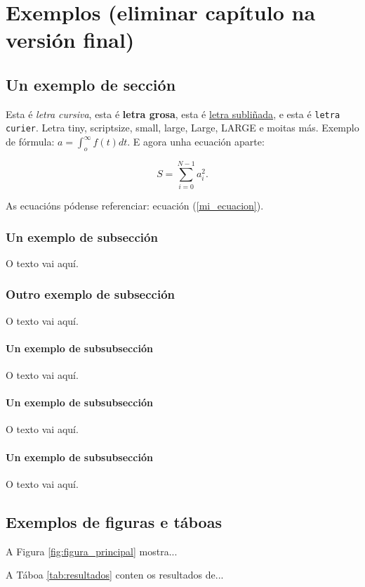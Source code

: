 \chapter{Exemplos (eliminar capítulo na versión final)}

\section{Un exemplo de sección}
Esta é {\it letra cursiva}, esta é {\bf letra grosa}, esta é \underline{letra subliñada}, e esta é {\tt letra curier}. Letra {\tiny tiny}, {\scriptsize scriptsize}, {\small small}, {\large large}, {\Large Large}, {\LARGE LARGE} e moitas más. Exemplo de fórmula: $a=\int_o^\infty f(t)dt$.  E agora unha ecuación aparte:

\begin{equation}
    S=\sum_{i=0}^{N-1} a_i^2 .
\label{mi_ecuacion}
\end{equation}

As ecuacións pódense referenciar: ecuación (\ref{mi_ecuacion}).

\subsection{Un exemplo de subsección}
O texto vai aquí.
\subsection{Outro exemplo de subsección}
O texto vai aquí.
\subsubsection{Un exemplo de subsubsección}
O texto vai aquí.
\subsubsection{Un exemplo de subsubsección}
O texto vai aquí.
\subsubsection{Un exemplo de subsubsección}
O texto vai aquí.

\section{Exemplos de figuras e táboas}

A Figura \ref{fig:figura_principal} mostra...

A Táboa \ref{tab:resultados} conten os resultados de...



